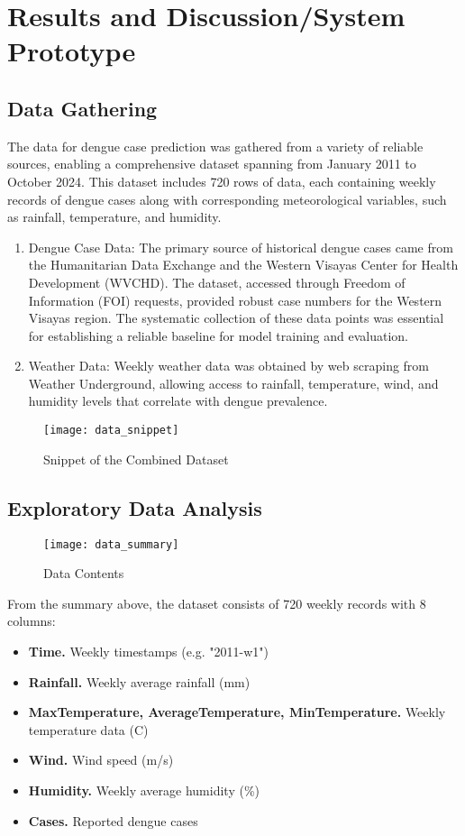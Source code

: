 \chapter{Results and Discussion/System Prototype}
\section{Data Gathering}
The data for dengue case prediction was gathered from a variety of reliable sources, enabling a comprehensive dataset spanning from January 2011 to October 2024. This dataset includes 720 rows of data, each containing weekly records of dengue cases along with corresponding meteorological variables, such as rainfall, temperature, and humidity.
\begin{enumerate}
	\item Dengue Case Data: The primary source of historical dengue cases came from the Humanitarian Data Exchange and the Western Visayas Center for Health Development (WVCHD). The dataset, accessed through Freedom of Information (FOI) requests, provided robust case numbers for the Western Visayas region. The systematic collection of these data points was essential for establishing a reliable baseline for model training and evaluation.
	\item Weather Data: Weekly weather data was obtained by web scraping from Weather Underground, allowing access to rainfall, temperature, wind, and humidity levels that correlate with dengue prevalence.
\end{enumerate}

\begin{figure}[ht]
	\centering
	\texttt{[image: data\_snippet]}
	\caption{Snippet of the Combined Dataset}
	\label{fig:data_snippet}
\end{figure}

\section{Exploratory Data Analysis}

\begin{figure}[h!]
	\centering
	\texttt{[image: data\_summary]}
	\caption{Data Contents}
	\label{fig:data_summary}
\end{figure}

From the summary above, the dataset consists of 720 weekly records with 8 columns:
\begin{itemize}
	\item \textbf{Time.} Weekly timestamps (e.g. "2011-w1")
	\item \textbf{Rainfall.} Weekly average rainfall (mm)
	\item \textbf{MaxTemperature, AverageTemperature, MinTemperature.} Weekly temperature data (C)
	\item \textbf{Wind.} Wind speed (m/s)
	\item \textbf{Humidity.} Weekly average humidity (\%)
	\item \textbf{Cases.} Reported dengue cases
\end{itemize}

